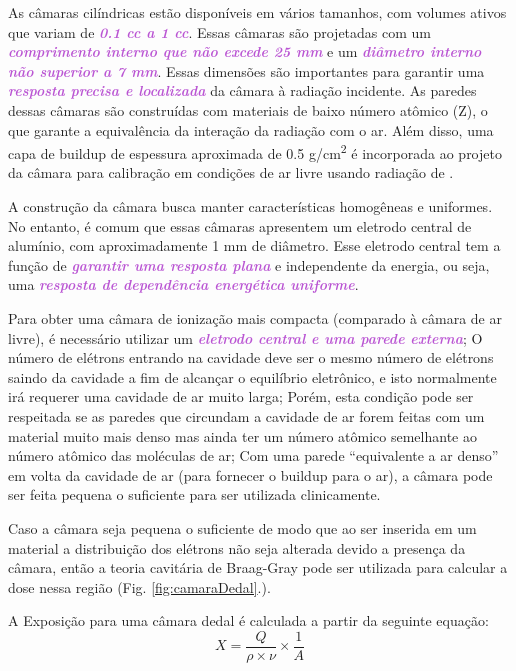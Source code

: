\documentclass[11pt,a4paper]{article}
\begin{document}
	As câmaras cilíndricas estão disponíveis em vários tamanhos, com volumes ativos que variam de \textcolor{MediumOrchid}{\textit{\textbf{0.1 cc a 1 cc}}}. Essas câmaras são projetadas com um \textcolor{MediumOrchid}{\textit{\textbf{comprimento interno que não excede 25 mm}}} e um \textcolor{MediumOrchid}{\textit{\textbf{diâmetro interno não superior a 7 mm}}}. Essas dimensões são importantes para garantir uma \textcolor{MediumOrchid}{\textit{\textbf{resposta precisa e localizada}}} da câmara à radiação incidente. As paredes dessas câmaras são construídas com materiais de baixo número atômico (Z), o que garante a equivalência da interação da radiação com o ar. Além disso, uma capa de buildup de espessura aproximada de 0.5 \unit{g/cm^2} é incorporada ao projeto da câmara para calibração em condições de ar livre usando radiação de .

	A construção da câmara busca manter características homogêneas e uniformes. No entanto, é comum que essas câmaras apresentem um eletrodo central de alumínio, com aproximadamente 1 mm de diâmetro. Esse eletrodo central tem a função de \textcolor{MediumOrchid}{\textit{\textbf{garantir uma resposta plana}}} e independente da energia, ou seja, uma \textcolor{MediumOrchid}{\textit{\textbf{resposta de dependência energética uniforme}}}.

	Para obter uma câmara de ionização mais compacta (comparado à câmara de ar livre), é necessário utilizar um \textcolor{MediumOrchid}{\textit{\textbf{eletrodo central e uma parede externa}}};  O número de elétrons entrando na cavidade deve ser o mesmo número de elétrons saindo da cavidade a fim de alcançar o equilíbrio eletrônico, e isto normalmente irá requerer uma cavidade de ar muito larga;	
	Porém, esta condição pode ser respeitada se as paredes que circundam a cavidade de ar forem feitas com um material muito mais denso mas ainda ter um número atômico semelhante ao número atômico das moléculas de ar; Com uma parede ``equivalente a ar denso'' em volta da cavidade de ar (para fornecer o buildup para o ar), a câmara pode ser feita pequena o suficiente para ser utilizada clinicamente.

	Caso a câmara seja pequena o suficiente de modo que ao ser inserida em um material a distribuição dos elétrons não seja alterada devido a presença da câmara, então a teoria cavitária de Braag-Gray pode ser utilizada para calcular a dose nessa região (Fig. \ref{fig:camaraDedal}.). 

		A Exposição para uma câmara dedal é calculada a partir da seguinte equação:
			\begin{equation}
				X = \frac{Q}{\rho \times \nu} \times \frac{1}{A}
			\end{equation}
\end{document}
